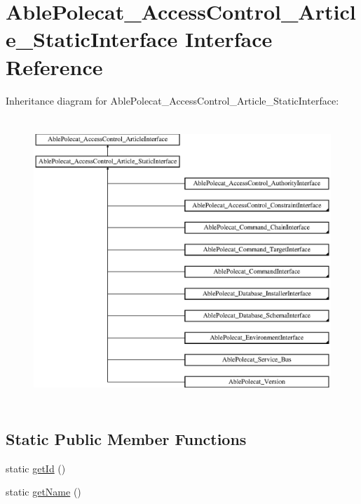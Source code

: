 \hypertarget{interface_able_polecat___access_control___article___static_interface}{}\section{Able\+Polecat\+\_\+\+Access\+Control\+\_\+\+Article\+\_\+\+Static\+Interface Interface Reference}
\label{interface_able_polecat___access_control___article___static_interface}
Inheritance diagram for Able\+Polecat\+\_\+\+Access\+Control\+\_\+\+Article\+\_\+\+Static\+Interface\+:\begin{figure}[H]
\begin{center}
\leavevmode
\includegraphics[height=10.838710cm]{interface_able_polecat___access_control___article___static_interface}
\end{center}
\end{figure}
\subsection*{Static Public Member Functions}
\begin{DoxyCompactItemize}
\item 
static \hyperlink{interface_able_polecat___access_control___article___static_interface_acfaa3a96d0cb5a4c0d4d710dcba41e9e}{get\+Id} ()
\item 
static \hyperlink{interface_able_polecat___access_control___article___static_interface_a4ef9bd37ba3ce8a13c1e8bcf4f72a630}{get\+Name} ()
\end{DoxyCompactItemize}


